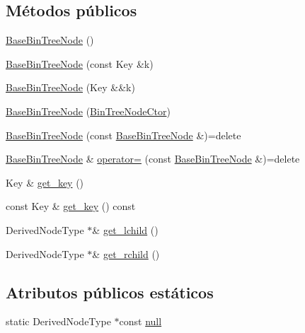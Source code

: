 \subsection*{Métodos públicos}
\begin{DoxyCompactItemize}
\item 
\hyperlink{class_designar_1_1_base_bin_tree_node_a2779b1f30e23443940aaa0ddfec895be}{Base\+Bin\+Tree\+Node} ()
\item 
\hyperlink{class_designar_1_1_base_bin_tree_node_a19dbfd3695d9213dc0d50a4637e92b16}{Base\+Bin\+Tree\+Node} (const Key \&k)
\item 
\hyperlink{class_designar_1_1_base_bin_tree_node_aaf8196a9b42a719173d03340f68b467f}{Base\+Bin\+Tree\+Node} (Key \&\&k)
\item 
\hyperlink{class_designar_1_1_base_bin_tree_node_a29c18682569084f8f64ca58b22f8f74a}{Base\+Bin\+Tree\+Node} (\hyperlink{namespace_designar_a679bc99fd69a3601faa5d6d47f865106}{Bin\+Tree\+Node\+Ctor})
\item 
\hyperlink{class_designar_1_1_base_bin_tree_node_a455b27b565e1dc004fd6292475d5a9de}{Base\+Bin\+Tree\+Node} (const \hyperlink{class_designar_1_1_base_bin_tree_node}{Base\+Bin\+Tree\+Node} \&)=delete
\item 
\hyperlink{class_designar_1_1_base_bin_tree_node}{Base\+Bin\+Tree\+Node} \& \hyperlink{class_designar_1_1_base_bin_tree_node_acde689f73c8d4fce33926e86882b0765}{operator=} (const \hyperlink{class_designar_1_1_base_bin_tree_node}{Base\+Bin\+Tree\+Node} \&)=delete
\item 
Key \& \hyperlink{class_designar_1_1_base_bin_tree_node_a59c9489fff0bd46c058e901d02b2e582}{get\+\_\+key} ()
\item 
const Key \& \hyperlink{class_designar_1_1_base_bin_tree_node_ab836466417ce1dad15b794424f39ee4b}{get\+\_\+key} () const
\item 
Derived\+Node\+Type $\ast$\& \hyperlink{class_designar_1_1_base_bin_tree_node_a60f8c88c08e4b68ecc9dd9a77b69cb7c}{get\+\_\+lchild} ()
\item 
Derived\+Node\+Type $\ast$\& \hyperlink{class_designar_1_1_base_bin_tree_node_a328220c701b0c58b024610cf8fb70850}{get\+\_\+rchild} ()
\end{DoxyCompactItemize}
\subsection*{Atributos públicos estáticos}
\begin{DoxyCompactItemize}
\item 
static Derived\+Node\+Type $\ast$const \hyperlink{class_designar_1_1_base_bin_tree_node_a0ea0251169acae6e7943ccc54f66472a}{null}
\end{DoxyCompactItemize}


